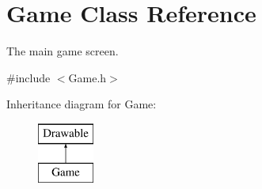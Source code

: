 \hypertarget{class_game}{}\section{Game Class Reference}
\label{class_game}


The main game screen.  




{\ttfamily \#include $<$Game.\+h$>$}

Inheritance diagram for Game\+:\begin{figure}[H]
\begin{center}
\leavevmode
\includegraphics[height=2.000000cm]{class_game}
\end{center}
\end{figure}
